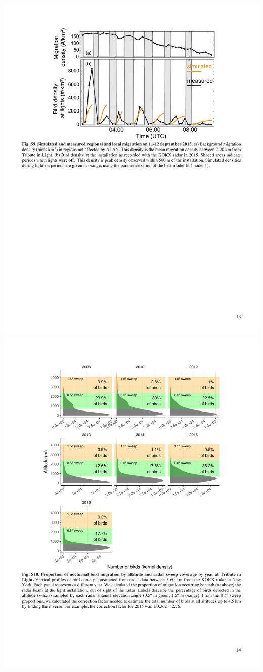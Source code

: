 \documentclass[a4paper, twoside]{templates/ociamthesis}
\begin{document}
\includegraphics[width=1\linewidth]{pdf_chapters/lights/lights_supp_crop_Part17}
\includegraphics[width=1\linewidth]{pdf_chapters/lights/lights_supp_crop_Part18}
\end{document}
